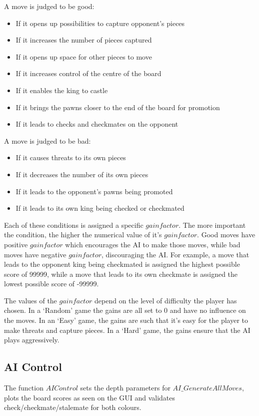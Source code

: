 \documentclass[11pt,a4paper]{article}
\begin{document}
\noindent A move is judged to be good:
\begin{itemize}
\item If it opens up possibilities to capture opponent’s pieces
\item If it increases the number of pieces captured
\item If it opens up space for other pieces to move
\item If it increases control of the centre of the board
\item If it enables the king to castle
\item If it brings the pawns closer to the end of the board for promotion
\item If it leads to checks and checkmates on the opponent
\end{itemize}

\noindent A move is judged to be bad:
\begin{itemize}
\item If it causes threats to its own pieces
\item If it decreases the number of its own pieces
\item If it leads to the opponent’s pawns being promoted
\item If it leads to its own king being checked or checkmated
\end{itemize}

Each of these conditions is assigned a specific $gainfactor$. The more important the condition, the higher the numerical value of it's $gainfactor$. Good moves have positive $gainfactor$ which encourages the AI to make those moves, while bad moves have negative $gainfactor$, discouraging the AI.
\newline
For example, a move that leads to the opponent king being checkmated is assigned the highest possible score of 99999, while a move that leads to its own checkmate is assigned the lowest possible score of -99999.

The values of the $gainfactor$ depend on the level of difficulty the player has chosen. In a ‘Random’ game the gains are all set to 0 and have no influence on the moves. In an ‘Easy’ game, the gains are such that it’s easy for the player to make threats and capture pieces. In a ‘Hard’ game, the gains ensure that the AI plays aggressively. 


\subsection{AI Control}
\indent\indent The function $AIControl$ sets the depth parameters for $AI\_GenerateAllMoves$, plots the board scores as seen on the GUI and validates check/checkmate/stalemate for both colours.
\end{document}
